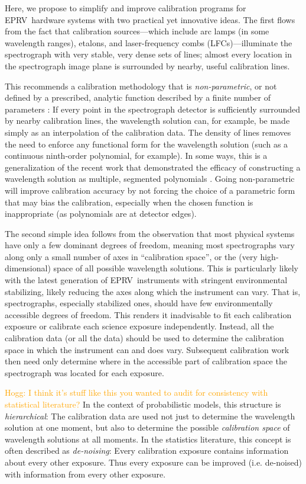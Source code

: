 \documentclass[modern]{aastex63}
\newcommand{\acronym}[1]{{\small{#1}}}
\newcommand{\eprv}{\acronym{EPRV}}
\newcommand{\lfc}{\acronym{LFC}}
\newcommand{\lz}[1]{\textcolor{orange}{#1}}
\begin{document}
Here, we propose to simplify and improve calibration programs for \eprv\ hardware systems with two practical yet innovative ideas.  The first flows from the fact that calibration sources---which include arc lamps (in some wavelength ranges), etalons, and laser-frequency combs (\lfc s)---illuminate the spectrograph with very stable, very dense sets of lines; almost every location in the spectrograph image plane is surrounded by nearby, useful calibration lines.

This recommends a calibration methodology that is \emph{non-parametric}, or not defined by a prescribed, analytic function described by a finite number of parameters :  If every point in the spectrograph detector is sufficiently surrounded by nearby calibration lines, the wavelength solution can, for example, be made simply as an interpolation of the calibration data.  The density of lines removes the need to enforce any functional form for the wavelength solution (such as a continuous ninth-order polynomial, for example).  In some ways, this is a generalization of the recent work that demonstrated the efficacy of constructing a wavelength solution as multiple, segmented polynomials \citep{milakovic2020}.  Going non-parametric will improve calibration accuracy by not forcing the choice of a parametric form that may bias the calibration, especially when the chosen function is inappropriate (as polynomials are at detector edges).

The second simple idea follows from the observation that most physical systems have only a few dominant degrees of freedom, meaning most spectrographs vary along only a small number of axes in ``calibration space'', or the (very high-dimensional) space of all possible wavelength solutions.  This is particularly likely with the latest generation of \eprv\ instruments with stringent environmental stabilizing, likely reducing the axes along which the instrument can vary.  That is, spectrographs, especially stabilized ones, should have few environmentally accessible degrees of freedom.  This renders it inadvisable to fit each calibration exposure or calibrate each science exposure independently.  Instead, all the calibration data (or all the data) should be used to determine the calibration space in which the instrument can and does vary.  Subsequent calibration work then need only determine where in the accessible part of calibration space the spectrograph was located for each exposure.

\lz{Hogg: I think it's stuff like this you wanted to audit for consistency with statistical literature?}
In the context of probabilistic models, this structure is \emph{hierarchical}:  The calibration data are used not just to determine the wavelength solution at one moment, but also to determine the possible \emph{calibration space} of wavelength solutions at all moments.  In the statistics literature, this concept is often described as \emph{de-noising}:  Every calibration exposure contains information about every other exposure.  Thus every exposure can be improved (i.e. de-noised) with information from every other exposure.
\end{document}
